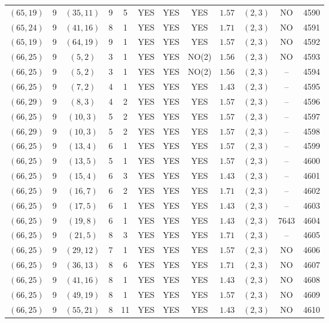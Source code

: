 \begin{longtable}{|c|c|c|c|c|c|c|c|c|c|c|c|}
$(65,19)$ & 9 & $(35,11)$ & 9 & 5 & YES & YES & YES & $1.57$ & $(2,3)$ & NO & 4590\\
$(65,24)$ & 9 & $(41,16)$ & 8 & 1 & YES & YES & YES & $1.71$ & $(2,3)$ & NO & 4591\\
$(65,19)$ & 9 & $(64,19)$ & 9 & 1 & YES & YES & YES & $1.57$ & $(2,3)$ & NO & 4592\\
$(66,25)$ & 9 & $(5,2)$ & 3 & 1 & YES & YES & NO(2) & $1.56$ & $(2,3)$ & NO & 4593\\
$(66,25)$ & 9 & $(5,2)$ & 3 & 1 & YES & YES & NO(2) & $1.56$ & $(2,3)$ & -- & 4594\\
$(66,25)$ & 9 & $(7,2)$ & 4 & 1 & YES & YES & YES & $1.43$ & $(2,3)$ & -- & 4595\\
$(66,29)$ & 9 & $(8,3)$ & 4 & 2 & YES & YES & YES & $1.57$ & $(2,3)$ & -- & 4596\\
$(66,25)$ & 9 & $(10,3)$ & 5 & 2 & YES & YES & YES & $1.57$ & $(2,3)$ & -- & 4597\\
$(66,29)$ & 9 & $(10,3)$ & 5 & 2 & YES & YES & YES & $1.57$ & $(2,3)$ & -- & 4598\\
$(66,25)$ & 9 & $(13,4)$ & 6 & 1 & YES & YES & YES & $1.57$ & $(2,3)$ & -- & 4599\\
$(66,25)$ & 9 & $(13,5)$ & 5 & 1 & YES & YES & YES & $1.57$ & $(2,3)$ & -- & 4600\\
$(66,25)$ & 9 & $(15,4)$ & 6 & 3 & YES & YES & YES & $1.43$ & $(2,3)$ & -- & 4601\\
$(66,25)$ & 9 & $(16,7)$ & 6 & 2 & YES & YES & YES & $1.71$ & $(2,3)$ & -- & 4602\\
$(66,25)$ & 9 & $(17,5)$ & 6 & 1 & YES & YES & YES & $1.43$ & $(2,3)$ & -- & 4603\\
$(66,25)$ & 9 & $(19,8)$ & 6 & 1 & YES & YES & YES & $1.43$ & $(2,3)$ & 7643 & 4604\\
$(66,25)$ & 9 & $(21,5)$ & 8 & 3 & YES & YES & YES & $1.71$ & $(2,3)$ & -- & 4605\\
$(66,25)$ & 9 & $(29,12)$ & 7 & 1 & YES & YES & YES & $1.57$ & $(2,3)$ & NO & 4606\\
$(66,25)$ & 9 & $(36,13)$ & 8 & 6 & YES & YES & YES & $1.71$ & $(2,3)$ & NO & 4607\\
$(66,25)$ & 9 & $(41,16)$ & 8 & 1 & YES & YES & YES & $1.43$ & $(2,3)$ & NO & 4608\\
$(66,25)$ & 9 & $(49,19)$ & 8 & 1 & YES & YES & YES & $1.57$ & $(2,3)$ & NO & 4609\\
$(66,25)$ & 9 & $(55,21)$ & 8 & 11 & YES & YES & YES & $1.43$ & $(2,3)$ & NO & 4610\\

\end{longtable}
